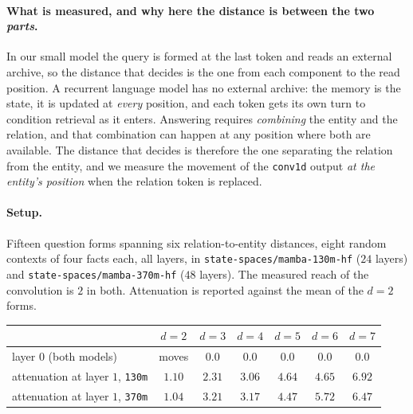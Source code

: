 \documentclass[10pt]{article}
\begin{document}
\paragraph{What is measured, and why here the distance is between the two \emph{parts}.} In our small
model the query is formed at the last token and reads an external archive, so the distance that
decides is the one from each component to the read position. A recurrent language model has no
external archive: the memory is the state, it is updated at \emph{every} position, and each token
gets its own turn to condition retrieval as it enters. Answering requires \emph{combining} the entity
and the relation, and that combination can happen at any position where both are available. The
distance that decides is therefore the one separating the relation from the entity, and we measure
the movement of the \texttt{conv1d} output \emph{at the entity's position} when the relation token is
replaced.

\paragraph{Setup.} Fifteen question forms spanning six relation-to-entity distances, eight random
contexts of four facts each, all layers, in \texttt{state-spaces/mamba-130m-hf} ($24$ layers) and
\texttt{state-spaces/mamba-370m-hf} ($48$ layers). The measured reach of the convolution is $2$ in
both. Attenuation is reported against the mean of the $d{=}2$ forms.

\begin{center}
\begin{tabular}{lcccccc}
\toprule
& $d{=}2$ & $d{=}3$ & $d{=}4$ & $d{=}5$ & $d{=}6$ & $d{=}7$ \\
\midrule
layer $0$ (both models) & moves & $\mathbf{0.0}$ & $\mathbf{0.0}$ & $\mathbf{0.0}$ & $\mathbf{0.0}$ & $\mathbf{0.0}$ \\
\midrule
attenuation at layer $1$, \texttt{130m} & $1.10$ & $2.31$ & $3.06$ & $4.64$ & $4.65$ & $6.92$ \\
attenuation at layer $1$, \texttt{370m} & $1.04$ & $3.21$ & $3.17$ & $4.47$ & $5.72$ & $6.47$ \\
\bottomrule
\end{tabular}
\end{center}
\end{document}
